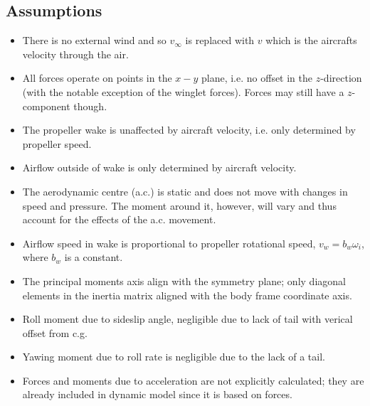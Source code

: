 \subsection{Assumptions}

\begin{itemize}
    \item There is no external wind and so $v_{\infty}$ is replaced with $v$ which is the aircrafts velocity through the air.

    \item All forces operate on points in the $x-y$ plane, i.e. no offset in the $z$-direction (with the notable exception of the winglet forces). Forces may still have a $z$-component though.

    \item The propeller wake is unaffected by aircraft velocity, i.e. only determined by propeller speed.

    \item Airflow outside of wake is only determined by aircraft velocity.

    \item The aerodynamic centre (a.c.) is static and does not move with changes in speed and pressure. The moment around it, however, will vary and thus account for the effects of the a.c. movement.

    \item Airflow speed in wake is proportional to propeller rotational speed, $v_w = b_w \omega_i$, where $b_w$ is a constant.

    \item The principal moments axis align with the symmetry plane; only diagonal elements in the inertia matrix aligned with the body frame coordinate axis.

    \item Roll moment due to sideslip angle, negligible due to lack of tail with verical offset from c.g.

    \item Yawing moment due to roll rate is negligible due to the lack of a tail.

    \item Forces and moments due to acceleration are not explicitly calculated; they are already included in  dynamic model since it is based on forces.

\end{itemize}